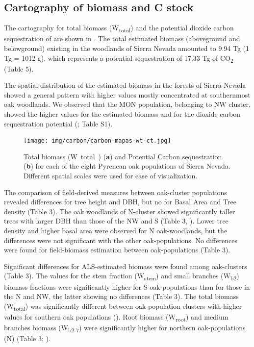 \subsection{Cartography of biomass and C stock}\label{sec:carbon:results-cartography}
The cartography for total biomass (W\textsubscript{total}) and the potential dioxide carbon sequestration of are shown in . The total estimated biomass (aboveground and belowground) existing in the \Qp woodlands of Sierra Nevada amounted to 9.94 Tg (1 Tg = 1012 g), which represents a potential sequestration of 17.33 Tg of CO\textsubscript{2} (Table 5).

The spatial distribution of the estimated biomass in the \Qp forests of Sierra Nevada showed a general pattern with higher values mostly concentrated at southernmost oak woodlands. We observed that the MON population, belonging to NW cluster, showed the higher values for the estimated biomass and for the dioxide carbon sequestration potential (; Table S1).

\begin{figure}
    \centering
    \texttt{[image: img/carbon/carbon-mapas-wt-ct.jpg]}
    \caption{Total biomass (W~total~) (\textbf{a}) and Potential Carbon sequestration (\textbf{b}) for each of the eight Pyrenean oak populations of Sierra Nevada. Different spatial scales were used for ease of visualization.}
    \label{fig:carbon:mapas-wt}
\end{figure}

The comparison of field-derived measures between oak-cluster populations revealed differences for tree height and DBH, but no for Basal Area and Tree density (Table 3). The oak woodlands of N-cluster showed significantly taller trees with larger DBH than those of the NW and S (Table 3, ). Lower tree density and higher basal area were observed for N oak-woodlands, but the differences were not significant with the other oak-populations. No differences were found for field-biomass estimation between oak-populations (Table 3).

Significant differences for ALS-estimated biomass were found among oak-clusters (Table 3). The values for the stem fraction (W\textsubscript{stem}) and small branches (W\textsubscript{b2}) biomass fractions were significantly higher for S oak-populations than for those in the N and NW, the latter showing no differences (Table 3). The total biomass (W\textsubscript{total}) was significantly different between oak-population clusters with higher values for southern oak populations (). Root biomass (W\textsubscript{root}) and medium branches biomass (W\textsubscript{b2-7}) were significantly higher for northern oak-populations (N) (Table 3; ).

